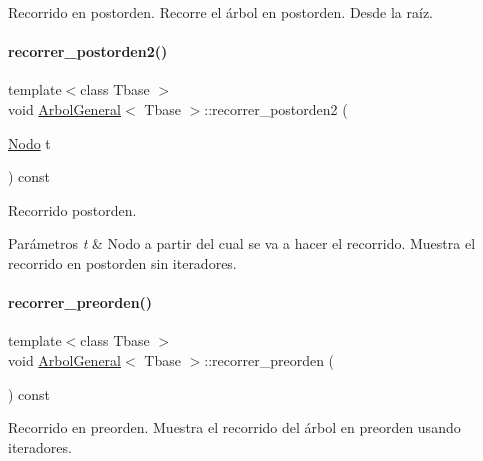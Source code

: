 Recorrido en postorden.  Recorre el árbol en postorden. Desde la raíz. 

\hypertarget{classArbolGeneral_aafec68ff2d9979b4a1fe860c2af622a7}{}\label{classArbolGeneral_aafec68ff2d9979b4a1fe860c2af622a7} 
\paragraph{\texorpdfstring{recorrer\+\_\+postorden2()}{recorrer\_postorden2()}}
{\footnotesize\ttfamily template$<$class Tbase $>$ \\
void \hyperlink{classArbolGeneral}{Arbol\+General}$<$ Tbase $>$\+::recorrer\+\_\+postorden2 (\begin{DoxyParamCaption}\item[{\hyperlink{classArbolGeneral_a12cc1b74a9095d89bc7334290d332f7a}{Nodo}}]{t }\end{DoxyParamCaption}) const}



Recorrido postorden. 


\begin{DoxyParams}{Parámetros}
{\em t} & Nodo a partir del cual se va a hacer el recorrido.  Muestra el recorrido en postorden sin iteradores. \\
\hline
\end{DoxyParams}
\hypertarget{classArbolGeneral_a41993789af53e60c86ec2031af533965}{}\label{classArbolGeneral_a41993789af53e60c86ec2031af533965} 
\paragraph{\texorpdfstring{recorrer\+\_\+preorden()}{recorrer\_preorden()}}
{\footnotesize\ttfamily template$<$class Tbase $>$ \\
void \hyperlink{classArbolGeneral}{Arbol\+General}$<$ Tbase $>$\+::recorrer\+\_\+preorden (\begin{DoxyParamCaption}{ }\end{DoxyParamCaption}) const}



Recorrido en preorden.  Muestra el recorrido del árbol en preorden usando iteradores. 

